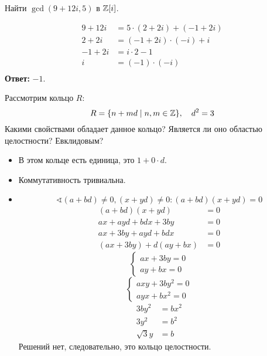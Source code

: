 \begin{exercise}
    Найти \(\gcd(9 + 12i, 5)\) в \(\mathbb{Z}[i]\).
\end{exercise}
\begin{solution}
    \begin{align*}
        9 + 12i  & = 5 \cdot (2 + 2i) + ( - 1 + 2i) \\
        2 + 2i   & = ( - 1 + 2i) \cdot ( -i) + i    \\
        - 1 + 2i & = i \cdot 2 - 1                  \\
        i        & = ( - 1) \cdot ( - i)            \\
    \end{align*}
    \textbf{Ответ:} \(- 1\).
\end{solution}

\begin{exercise}
    Рассмотрим кольцо \(R\):
    \[R = \{n + md \mid n,m \in \mathbb{Z}\}, \quad d^2 = 3\]
    Какими свойствами обладает данное кольцо? Является ли оно областью целостности? Евклидовым?
\end{exercise}
\begin{solution}\itemfix
    \begin{itemize}
        \item В этом кольце есть единица, это \(1 + 0 \cdot d\).
        \item Коммутативность тривиальна.
        \item \[\sphericalangle (a + bd) \neq 0, (x + yd) \neq 0 : (a + bd)(x + yd) = 0\]
              \begin{align*}
                  (a + bd)(x + yd)        & = 0 \\
                  ax + ayd + bdx + 3by    & = 0 \\
                  ax + 3by + ayd + bdx    & = 0 \\
                  (ax + 3by) + d(ay + bx) & = 0
              \end{align*}
              \[\begin{cases}
                      ax + 3by = 0 \\
                      ay + bx = 0
                  \end{cases}\]
              \[\begin{cases}
                      axy + 3by^2 = 0 \\
                      ayx + bx^2 = 0
                  \end{cases}\]
              \begin{align*}
                  3by^2      & = bx^2 \\
                  3y^2       & = b^2  \\
                  \sqrt{3} y & = b
              \end{align*}
              Решений нет, следовательно, это кольцо целостности.
    \end{itemize}
\end{solution}

